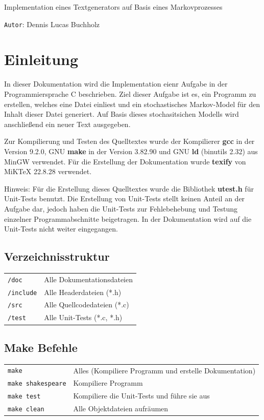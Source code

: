 \documentclass[10pt,a4paper]{article}
\newcommand{\Title}[1]{\begin{center}\begin{LARGE}#1\vspace{8pt}\end{LARGE}\end{center}}
\begin{document}
\begin{spacing}{1}

\Title{Implementation eines Textgenerators auf Basis eines Markovprozesses}
\texttt{Autor}: Dennis Lucas Buchholz


\section{Einleitung}

In dieser Dokumentation wird die Implementation eienr Aufgabe in der
Programmiersprache C beschrieben. Ziel dieser Aufgabe ist es, ein Programm zu
erstellen, welches eine Datei einliest und ein stochastisches Markov-Model für den
Inhalt dieser Datei generiert. Auf Basis dieses stochasitsichen Modells 
wird anschließend ein neuer Text ausgegeben. 

Zur Kompilierung und Testen des Quelltextes wurde der Kompilierer
\textbf{gcc} in der Version 9.2.0, GNU \textbf{make} in der Version 3.82.90
und GNU \textbf{ld} (binutils 2.32) aus MinGW verwendet.
Für die Erstellung der Dokumentation wurde \textbf{texify} von MiKTeX 22.8.28
verwendet.

Hinweis: Für die Erstellung dieses Quelltextes wurde die Bibliothek
\textbf{utest.h} für Unit-Tests benutzt. Die Erstellung von Unit-Tests stellt
keinen Anteil an der Aufgabe dar, jedoch haben die Unit-Tests zur Fehlebehebung
und Testung einzelner Programmabschnitte beigetragen. In der Dokumentation wird
auf die Unit-Tests nicht weiter eingegangen.

\subsection{Verzeichnisstruktur}

\begin{tabular}{ l l }
\texttt{/doc} & Alle Dokumentationsdateien \\
\texttt{/include} & Alle Headerdateien (*.h) \\
\texttt{/src} & Alle Quellcodedateien (*.c) \\
\texttt{/test} & Alle Unit-Tests (*.c, *.h) \\
\end{tabular}

\subsection{Make Befehle}
\begin{tabular}{ l l }
    \texttt{make} & Alles (Kompiliere Programm und erstelle Dokumentation) \\
    \texttt{make shakespeare} & Kompiliere Programm \\
    \texttt{make test} & Kompiliere die Unit-Tests und führe sie aus \\
    \texttt{make clean} & Alle Objektdateien aufräumen \\
\end{tabular}


\end{spacing}
\end{document}
